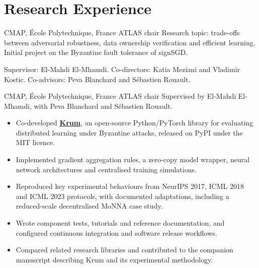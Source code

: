 \section{Research Experience}

  {CMAP, \textnormal{\'E}cole Polytechnique, France \textnormal{\textbar} ATLAS chair}
Research topic: trade-offs between adversarial robustness, data ownership
verification and efficient learning. Initial project on the Byzantine fault
tolerance of signSGD.\par
Supervisor: El-Mahdi El-Mhamdi. Co-directors: Katia Meziani and Vladimir Kostic.
Co-advisors: Peva Blanchard and S\'ebastien Rouault.

  {CMAP, \textnormal{\'E}cole Polytechnique, France \textnormal{\textbar} ATLAS chair}
Supervised by El-Mahdi El-Mhamdi, with Peva Blanchard and S\'ebastien Rouault.
\begin{itemize}
  \item Co-developed \href{https://links.arthurdanjou.fr/krum}{\textbf{Krum}}, an
    open-source Python/PyTorch library for evaluating distributed learning under
    Byzantine attacks, released on PyPI under the MIT licence.
  \item Implemented gradient aggregation rules, a zero-copy model wrapper,
    neural network architectures and centralised training simulations.
  \item Reproduced key experimental behaviours from NeurIPS 2017, ICML 2018
    and ICML 2023 protocols, with documented adaptations, including a
    reduced-scale decentralised MoNNA case study.
  \item Wrote component tests, tutorials and reference documentation, and
    configured continuous integration and software release workflows.
  \item Compared related research libraries and contributed to the companion
    manuscript describing Krum and its experimental methodology.
\end{itemize}
